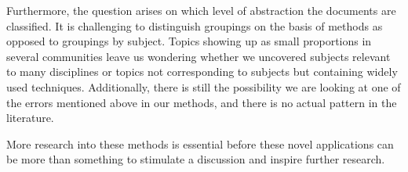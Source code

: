 \documentclass[runningheads]{llncs}
\begin{document}
Furthermore, the question arises on which level of abstraction the documents are classified. It is challenging to distinguish groupings on the basis of methods as opposed to groupings by subject. Topics showing up as small proportions in several communities leave us wondering whether we uncovered subjects relevant to many disciplines or topics not corresponding to subjects but containing widely used techniques. Additionally, there is still the possibility we are looking at one of the errors mentioned above in our methods, and there is no actual pattern in the literature.

More research into these methods is essential before these novel applications can be more than something to stimulate a discussion and inspire further research. 



\end{document}
